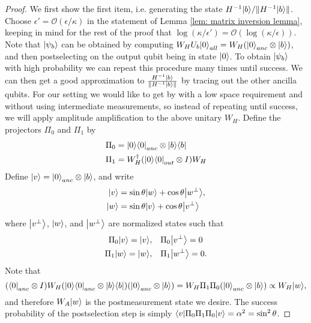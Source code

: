 \documentclass[11pt]{article}
\theoremstyle{definition}
\theoremstyle{remark}
\begin{document}
\begin{proof}
We first show the first item, i.e. generating the state $H^{-1}{\left\vert{b}\right\rangle} / \|H^{-1}{\left\vert{b}\right\rangle}\|$. Choose $\epsilon' = \mathcal{O}(\epsilon/\kappa)$ in the statement of Lemma \ref{lem: matrix inversion lemma}, keeping in mind for the rest of the proof that $\log(\kappa/\epsilon') = \mathcal{O}(\log(\kappa/\epsilon))$. Note that ${\left\vert{\psi_b}\right\rangle}$ can be obtained by computing $W_HU_b{\left\vert{0}\right\rangle}_{all} = W_H ({\left\vert{0}\right\rangle}_{anc} \otimes {\left\vert{b}\right\rangle})$, and then postselecting on the output qubit being in state ${\left\vert{0}\right\rangle}$. To obtain ${\left\vert{\psi_b}\right\rangle}$ with high probability we can repeat this procedure many times until success. We can then get a good approximation to $\frac{H^{-1}{\left\vert{b}\right\rangle}} {\|H^{-1}{\left\vert{b}\right\rangle}\|} $ by tracing out the other ancilla qubits. For our setting we would like to get by with a low space requirement and without using intermediate measurements, so instead of repeating until success, we will apply amplitude amplification to the above unitary $W_H$. Define the projectors $\Pi_0$ and $\Pi_1$ by
\begin{align}
\Pi_0 &= {\left\vert{0}\right\rangle}{\left\langle{0}\right\vert}_{anc} \otimes {\left\vert{b}\right\rangle}{\left\langle{b}\right\vert} \\
\Pi_1 &= W_H^\dagger ({\left\vert{0}\right\rangle}{\left\langle{0}\right\vert}_{out} \otimes I) W_H
\end{align}
Define ${\left\vert{v}\right\rangle} = {\left\vert{0}\right\rangle}_{anc}\otimes {\left\vert{b}\right\rangle}$, and write
\begin{align}
{\left\vert{v}\right\rangle} &= \sin \theta {\left\vert{w}\right\rangle} +\cos \theta{\left\vert{w^\perp}\right\rangle}, \\
{\left\vert{w}\right\rangle} &= \sin \theta {\left\vert{v}\right\rangle} + \cos \theta{\left\vert{v^\perp}\right\rangle}
\end{align}
where ${\left\vert{v^\perp}\right\rangle}$, ${\left\vert{w}\right\rangle}$, and ${\left\vert{w^\perp}\right\rangle}$ are normalized states such that 
\begin{align}
\Pi_0{\left\vert{v}\right\rangle} = {\left\vert{v}\right\rangle},&\quad \Pi_0{\left\vert{v^\perp}\right\rangle} = 0 \\
\Pi_1{\left\vert{w}\right\rangle} = {\left\vert{w}\right\rangle},&\quad \Pi_1{\left\vert{w^\perp}\right\rangle} = 0.
\end{align}
Note that
\begin{equation} 
({\left\langle{0}\right\vert}_{anc} \otimes I) W_H ({\left\vert{0}\right\rangle}{\left\langle{0}\right\vert}_{anc} \otimes {\left\vert{b}\right\rangle}{\left\langle{b}\right\vert}) ({\left\vert{0}\right\rangle}_{anc} \otimes {\left\vert{b}\right\rangle}) = W_H \Pi_1\Pi_0({\left\vert{0}\right\rangle}_{anc} \otimes {\left\vert{b}\right\rangle}) \propto W_H {\left\vert{w}\right\rangle},
\end{equation}
and therefore $W_A{\left\vert{w}\right\rangle}$ is the postmeasurement state we desire. The success probability of the postselection step is simply ${\left\langle{v}\right\vert}\Pi_0\Pi_1\Pi_0{\left\vert{v}\right\rangle} = \alpha^2 = \sin^2\theta$. 


\end{proof}
\end{document}
